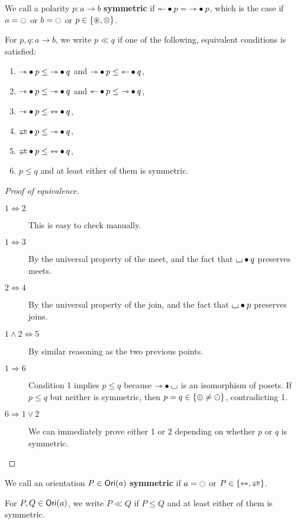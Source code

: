 \documentclass[a4paper]{memoir}
\begin{document}
\begin{definition}
	We call a polarity $p : a \to b$ \textbf{symmetric} if ${\leftarrowtriangle} \mathbin{\bullet} p = {\rightarrowtriangle} \mathbin{\bullet} p$, which is the case if $a = \npolar$ or $b = \npolar$ or $p \in \mathopen{}\left\{ {\oast}, {\otimes} \right\}\mathclose{}$.
	
	For $p, q : a \to b$, we write $p \ll q$ if one of the following, equivalent conditions is satisfied:
	\begin{enumerate}
		\item ${\rightarrowtriangle} \mathbin{\bullet} p \leq {\rightarrowtriangle} \mathbin{\bullet} q$ and ${\rightarrowtriangle} \mathbin{\bullet} p \leq {\leftarrowtriangle} \mathbin{\bullet} q$,
		\item ${\rightarrowtriangle} \mathbin{\bullet} p \leq {\rightarrowtriangle} \mathbin{\bullet} q$ and ${\leftarrowtriangle} \mathbin{\bullet} p \leq {\rightarrowtriangle} \mathbin{\bullet} q$,
		\item ${\rightarrowtriangle} \mathbin{\bullet} p \leq {\leftrightarrowtriangle} \mathbin{\bullet} q$,
		\item $\infrajetsym \oriof p \leq \jetsym \oriof q$,
		\item $\infrajetsym \oriof p \leq \equijetsym \oriof q$,
		\item $p \leq q$ and at least either of them is symmetric.
	\end{enumerate}
\end{definition}
\begin{proof}[Proof of equivalence]
	\begin{description}
		\item[$1 \Leftrightarrow 2$] This is easy to check manually.
		\item[$1 \Leftrightarrow 3$] By the universal property of the meet, and the fact that ${\llcorner\hspace{-.4ex}\lrcorner} \mathbin{\bullet} q$ preserves meets.
		\item[$2 \Leftrightarrow 4$] By the universal property of the join, and the fact that ${\llcorner\hspace{-.4ex}\lrcorner} \mathbin{\bullet} p$ preserves joins.
		\item[$1 \wedge 2 \Leftrightarrow 5$] By similar reasoning as the two previous points.
		\item[$1 \Rightarrow 6$] Condition 1 implies $p \leq q$ because ${\rightarrowtriangle} \mathbin{\bullet} {\llcorner\hspace{-.4ex}\lrcorner}$ is an isomorphism of posets. If $p \leq q$ but neither is symmetric, then $p = q \in \mathopen{}\left\{ {\oplus} \neq {\ominus} \right\}\mathclose{}$, contradicting 1.
		\item[$6 \Rightarrow 1 \vee 2$] We can immediately prove either 1 or 2 depending on whether $p$ or $q$ is symmetric. \qedhere
	\end{description}
\end{proof}
\begin{definition}
	We call an orientation $P \in {\mathsf{Ori}}(a)$ \textbf{symmetric} if $a = \npolar$ or $P \in \accol{\equijetsym, \infrajetsym}$.
	
	For $P, Q \in {\mathsf{Ori}}(a)$, we write $P \ll Q$ if $P \leq Q$ and at least either of them is symmetric.
\end{definition}
\end{document}
